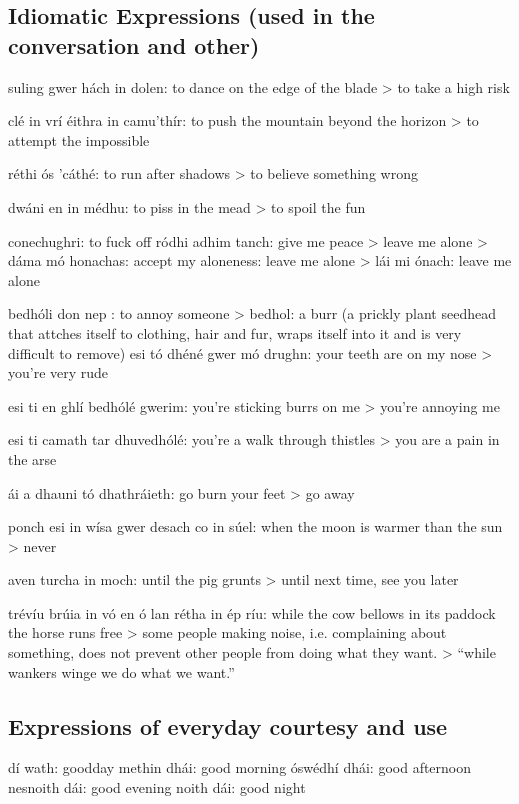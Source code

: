 \subsection{Idiomatic Expressions (used in the conversation and other)}

suling gwer h\'{a}ch in dolen: to dance on the edge of the blade
> to take a high risk

cl\'{e} in vr\'{i} \'{e}ithra in camu'th\'{i}r: to push the mountain beyond the horizon
> to attempt the impossible

r\'{e}thi \'{o}s 'c\'{a}th\'{e}: to run after shadows
> to believe something wrong

dw\'{a}ni en in m\'{e}dhu: to piss in the mead
> to spoil the fun

conechughri: to fuck off
r\'{o}dhi adhim tanch: give me peace > leave me alone
> d\'{a}ma m\'{o} honachas: accept my aloneness: leave me alone
> l\'{a}i mi \'{o}nach: leave me alone

bedh\'{o}li don nep : to annoy someone
> bedhol: a burr (a prickly plant seedhead that attches itself to clothing, hair and fur, wraps itself into it and is very difficult to remove) esi t\'{o} dh\'{e}n\'{e} gwer m\'{o} drughn: your teeth are on my nose 
> you're very rude

esi ti en ghl\'{i} bedh\'{o}l\'{e} gwerim: you're sticking burrs on me
> you're annoying me

esi ti camath tar dhuvedh\'{o}l\'{e}: you're a walk through thistles
> you are a pain in the arse

\'{a}i a dhauni t\'{o} dhathr\'{a}ieth: go burn your feet
> go away

ponch esi in w\'{i}sa gwer desach co in s\'{u}el: when the moon is warmer than the sun
> never

aven turcha in moch: until the pig grunts
> until next time, see you later

tr\'{e}v\'{i}u br\'{u}ia in v\'{o} en \'{o} lan r\'{e}tha in \'{e}p r\'{i}u: while the cow bellows in its paddock the horse runs free
> some people making noise, i.e. complaining about something, does not prevent other people from doing what they want. > ``while wankers winge we do what we want.''

\subsection{Expressions of everyday courtesy and use}

d\'{i} wath: goodday
methin dh\'{a}i: good morning
\'{o}sw\'{e}dh\'{i} dh\'{a}i: good afternoon
nesnoith d\'{a}i: good evening
noith d\'{a}i: good night

